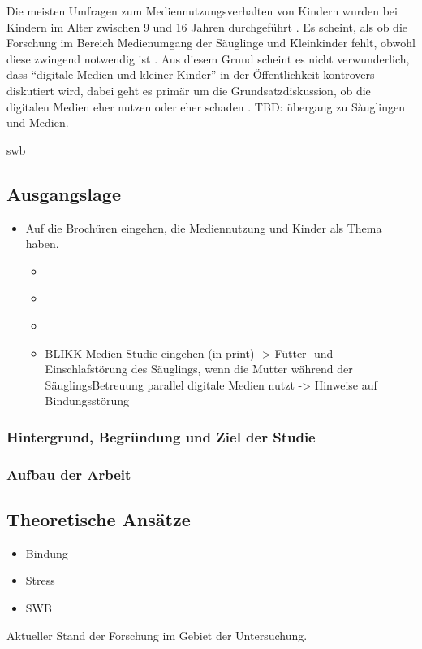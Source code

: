 Die meisten Umfragen zum Mediennutzungsverhalten von Kindern wurden bei Kindern im Alter zwischen 9 und 16 Jahren durchgeführt \cite{Chaudron2015}. Es scheint, als ob die Forschung im Bereich Medienumgang der Säuglinge und Kleinkinder fehlt, obwohl diese zwingend notwendig ist \cite{Olafsson2014, Konitzer2017}. Aus diesem Grund scheint es nicht verwunderlich, dass \enquote{digitale Medien und kleiner Kinder} in der Öffentlichkeit kontrovers diskutiert wird, dabei geht es primär um die Grundsatzdiskussion, ob die digitalen Medien eher nutzen oder eher schaden \cite{Divsi2015}.  
TBD: übergang zu Sàuglingen und Medien.


\gls{swb}

\subsection{Ausgangslage}
\begin{itemize}
    \item Auf die Brochüren eingehen, die Mediennutzung und Kinder als Thema haben.
    \begin{itemize}
        \item \cite{Weber2017}
        \item \cite{MariaLuisaNuesch2017}
        \item \cite{Elternbildung2017}
        \item BLIKK-Medien Studie eingehen (in print) -> Fütter- und Einschlafstörung des Säuglings, wenn die Mutter während der SäuglingsBetreuung parallel digitale Medien nutzt -> Hinweise auf Bindungsstörung
    \end{itemize}
\end{itemize}
\subsubsection{Hintergrund, Begründung und Ziel der Studie}
\subsubsection{Aufbau der Arbeit}

\subsection{Theoretische Ansätze}
\begin{itemize}
 \item Bindung
 \item Stress
 \item SWB
\end{itemize}
Aktueller Stand der Forschung im Gebiet der Untersuchung.

